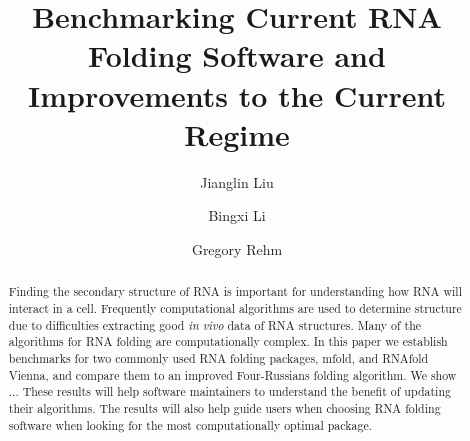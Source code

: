 \documentclass[12pt]{article}
\title{Benchmarking Current RNA Folding Software and Improvements to the Current Regime}
\begin{document}
\author{Jianglin Liu}
\author{Bingxi Li}
\author{Gregory Rehm}
\maketitle

\begin{abstract}
Finding the secondary structure of RNA is important for understanding how RNA
will interact in a cell. Frequently computational algorithms are used to determine
structure due to difficulties extracting good \textit{in vivo} data of RNA
structures. Many of the algorithms for RNA folding are computationally complex.
In this paper we establish benchmarks for two commonly used RNA folding packages,
mfold, and RNAfold Vienna, and compare them to an improved Four-Russians folding
algorithm. We show ... These results will help software maintainers to understand
the benefit of updating their algorithms. The results will also help guide users
when choosing RNA folding software when looking for the most computationally optimal package.
\end{abstract}
\end{document}
